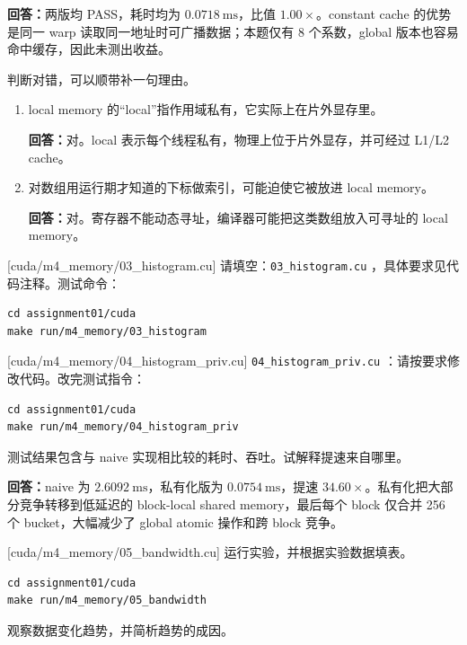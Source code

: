 \documentclass[11pt,a4paper,fontset=windows]{ctexart}
\begin{document}
\par\textbf{回答：}两版均 PASS，耗时均为 $0.0718\ \mathrm{ms}$，比值 $1.00\times$。constant cache 的优势是同一 warp 读取同一地址时可广播数据；本题仅有 8 个系数，global 版本也容易命中缓存，因此未测出收益。

判断对错，可以顺带补一句理由。
\begin{enumerate}[label=(\alph*)]
  \item local memory 的“local”指作用域私有，它实际上在片外显存里。
  \par\textbf{回答：}对。local 表示每个线程私有，物理上位于片外显存，并可经过 L1/L2 cache。
  \item 对数组用运行期才知道的下标做索引，可能迫使它被放进 local memory。
  \par\textbf{回答：}对。寄存器不能动态寻址，编译器可能把这类数组放入可寻址的 local memory。
\end{enumerate}

[cuda/m4\_memory/03\_histogram.cu]
请填空：\texttt{03\_histogram.cu} ，具体要求见代码注释。测试命令：

\begin{lstlisting}
cd assignment01/cuda
make run/m4_memory/03_histogram
\end{lstlisting}

[cuda/m4\_memory/04\_histogram\_priv.cu]
\texttt{04\_histogram\_priv.cu} ：请按要求修改代码。改完测试指令：

\begin{lstlisting}
cd assignment01/cuda
make run/m4_memory/04_histogram_priv
\end{lstlisting}

测试结果包含与 naive 实现相比较的耗时、吞吐。试解释提速来自哪里。

\par\textbf{回答：}naive 为 $2.6092\ \mathrm{ms}$，私有化版为 $0.0754\ \mathrm{ms}$，提速 $34.60\times$。私有化把大部分竞争转移到低延迟的 block-local shared memory，最后每个 block 仅合并 256 个 bucket，大幅减少了 global atomic 操作和跨 block 竞争。

[cuda/m4\_memory/05\_bandwidth.cu]
运行实验，并根据实验数据填表。

\begin{lstlisting}
cd assignment01/cuda
make run/m4_memory/05_bandwidth
\end{lstlisting}

观察数据变化趋势，并简析趋势的成因。
\end{document}
